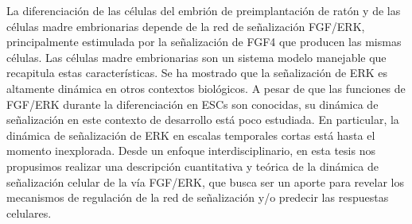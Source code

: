 \documentclass[./main.tex]{subfiles}
\begin{document}





La diferenciación de las células del embrión de preimplantación de ratón y de las células madre embrionarias depende de la red de señalización FGF/ERK, principalmente estimulada por la señalización de FGF4 que producen las mismas células. Las células madre embrionarias son un sistema modelo manejable que recapitula estas características. Se ha mostrado que la señalización de ERK es altamente dinámica en otros contextos biológicos. A pesar de que las funciones de FGF/ERK durante la diferenciación en ESCs son conocidas, su dinámica de señalización en este contexto de desarrollo está poco estudiada. En particular, la dinámica de señalización de ERK en escalas temporales cortas está hasta el momento inexplorada. Desde un enfoque interdisciplinario, en esta tesis nos propusimos realizar una descripción cuantitativa y teórica de la dinámica de señalización celular de la vía FGF/ERK, que busca ser un aporte para revelar los mecanismos de regulación de la red de señalización y/o predecir las respuestas celulares. 


\end{document}
